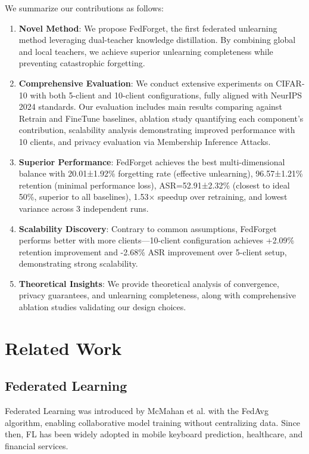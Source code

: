 \documentclass[10pt,twocolumn]{article}
\begin{document}
We summarize our contributions as follows:

\begin{enumerate}
\item \textbf{Novel Method}: We propose FedForget, the first federated unlearning method leveraging dual-teacher knowledge distillation. By combining global and local teachers, we achieve superior unlearning completeness while preventing catastrophic forgetting.

\item \textbf{Comprehensive Evaluation}: We conduct extensive experiments on CIFAR-10 with both 5-client and 10-client configurations, fully aligned with NeurIPS 2024 standards. Our evaluation includes main results comparing against Retrain and FineTune baselines, ablation study quantifying each component's contribution, scalability analysis demonstrating improved performance with 10 clients, and privacy evaluation via Membership Inference Attacks.

\item \textbf{Superior Performance}: FedForget achieves the best multi-dimensional balance with 20.01±1.92\% forgetting rate (effective unlearning), 96.57±1.21\% retention (minimal performance loss), ASR=52.91±2.32\% (closest to ideal 50\%, superior to all baselines), 1.53× speedup over retraining, and lowest variance across 3 independent runs.

\item \textbf{Scalability Discovery}: Contrary to common assumptions, FedForget performs better with more clients—10-client configuration achieves +2.09\% retention improvement and -2.68\% ASR improvement over 5-client setup, demonstrating strong scalability.

\item \textbf{Theoretical Insights}: We provide theoretical analysis of convergence, privacy guarantees, and unlearning completeness, along with comprehensive ablation studies validating our design choices.
\end{enumerate}

\section{Related Work}

\subsection{Federated Learning}

Federated Learning was introduced by McMahan et al. with the FedAvg algorithm, enabling collaborative model training without centralizing data. Since then, FL has been widely adopted in mobile keyboard prediction, healthcare, and financial services.
\end{document}

